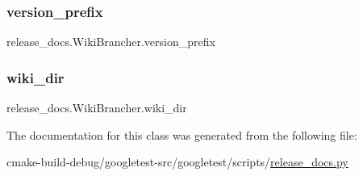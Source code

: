 \subsubsection{\texorpdfstring{version\_prefix}{version\_prefix}}
{\footnotesize\ttfamily release\+\_\+docs.\+Wiki\+Brancher.\+version\+\_\+prefix}

\mbox{\label{classrelease__docs_1_1WikiBrancher_ad86478c9538ac0bf3916f67eb5da2910}} 
\subsubsection{\texorpdfstring{wiki\_dir}{wiki\_dir}}
{\footnotesize\ttfamily release\+\_\+docs.\+Wiki\+Brancher.\+wiki\+\_\+dir}



The documentation for this class was generated from the following file\+:\begin{DoxyCompactItemize}
\item 
cmake-\/build-\/debug/googletest-\/src/googletest/scripts/\mbox{\hyperlink{release__docs_8py}{release\+\_\+docs.\+py}}\end{DoxyCompactItemize}
